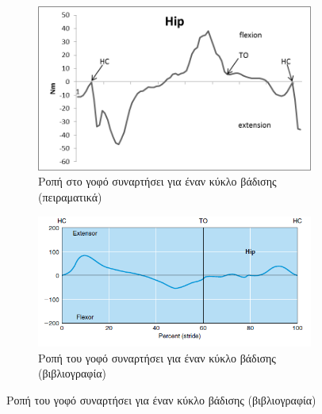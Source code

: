 \begin{figure}[H]
    \centering
    \begin{subfigure}[t]{.48\textwidth}
        \includegraphics[width=\textwidth, keepaspectratio]{fig/id-hip.png}
        \caption{Ροπή στο γοφό συναρτήσει για έναν κύκλο βάδισης (πειραματικά)}
        \label{fig:hip-moment}
    \end{subfigure}
    \begin{subfigure}[t]{.48\textwidth}
        \includegraphics[width=\textwidth, keepaspectratio]{fig/id-hip-ref.png}
        \caption{Ροπή του γοφό συναρτήσει για έναν κύκλο βάδισης (βιβλιογραφία)}
        \label{fig:hip-moment-ref}
    \end{subfigure}


\end{figure}
